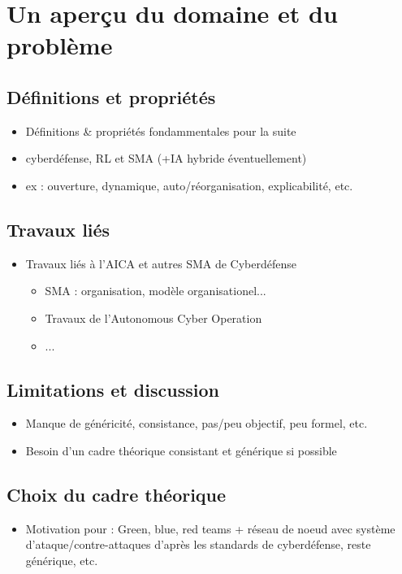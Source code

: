 \chapter{Un aperçu du domaine et du problème}\label{ch:domain_problem}

\section{Définitions et propriétés}
\begin{itemize}

    \item Définitions \& propriétés fondammentales pour la suite
    \item cyberdéfense, RL et SMA (+IA hybride éventuellement)
    \item ex : ouverture, dynamique, auto/réorganisation, explicabilité, etc.
\end{itemize}
\section{Travaux liés}
\begin{itemize}

    \item Travaux liés à l’AICA et autres SMA de Cyberdéfense
          \begin{itemize}
              \item SMA : organisation, modèle organisationel...
              \item Travaux de l'Autonomous Cyber Operation
              \item ...
          \end{itemize}
\end{itemize}
\section{Limitations et discussion}
\begin{itemize}

    \item Manque de généricité, consistance, pas/peu objectif, peu formel, etc.
    \item Besoin d’un cadre théorique consistant et générique si possible
\end{itemize}
\section{Choix du cadre théorique}
\begin{itemize}
    \item Motivation pour : Green, blue, red teams + réseau de noeud avec système d’ataque/contre-attaques d’après les standards de cyberdéfense, reste générique, etc.
\end{itemize}
